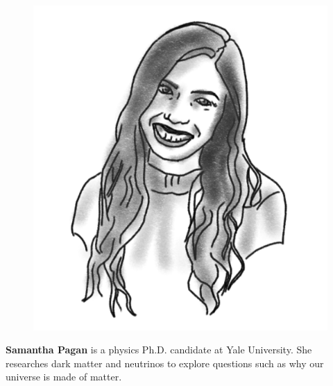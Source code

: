 \begin{figure}
\vspace{-2.5\intextsep}
\includegraphics[width=0.9\linewidth]{portraits/samantha.png}
\end{figure}
\textbf{Samantha Pagan} is a physics Ph.D. candidate at Yale University. She researches dark matter and neutrinos to explore questions such as why our universe is made of matter.\\
\\

